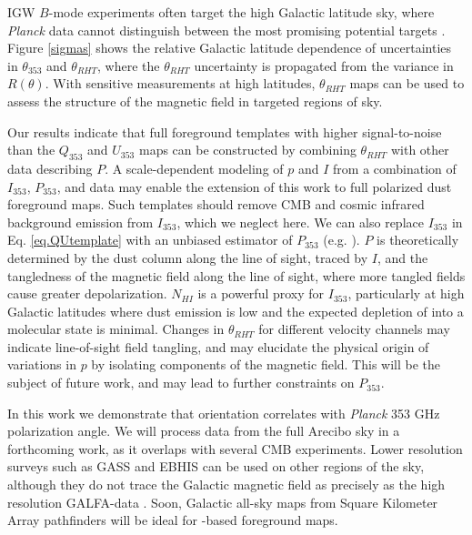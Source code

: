 IGW $B$-mode experiments often target the high Galactic latitude sky, where \textit{Planck} data cannot distinguish between the most promising potential targets \cite{Kovetz:2015tc}. Figure \ref{sigmas} shows the relative Galactic latitude dependence of uncertainties in $\theta_{353}$ and $\theta_{RHT}$, where the $\theta_{RHT}$ uncertainty is propagated from the variance in $R\left(\theta\right)$. With sensitive measurements at high latitudes, $\theta_{RHT}$ maps can be used to assess the structure of the magnetic field in targeted regions of sky.

Our results indicate that full foreground templates with higher signal-to-noise than the $Q_{353}$ and $U_{353}$ maps can be constructed by combining $\theta_{RHT}$ with other data describing $P$. A scale-dependent modeling of $p$ and $I$ from a combination of $I_{353}$, $P_{353}$, and \hi data may enable the extension of this work to full polarized dust foreground maps. Such templates should remove CMB and cosmic infrared background emission from $I_{353}$, which we neglect here. We can also replace $I_{353}$ in Eq. \ref{eq.QUtemplate} with an unbiased estimator of $P_{353}$ (e.g. \cite{Plaszczynski:2013gg, 2014arXiv1410.4436V}). $P$ is theoretically determined by the dust column along the line of sight, traced by $I$, and the tangledness of the magnetic field along the line of sight, where more tangled fields cause greater depolarization. $N_{HI}$ is a powerful proxy for $I_{353}$, particularly at high Galactic latitudes where dust emission is low and the expected depletion of \hi into a molecular state is minimal. Changes in $\theta_{RHT}$ for different \hi velocity channels may indicate line-of-sight field tangling, and may elucidate the physical origin of variations in $p$ by isolating components of the magnetic field. This will be the subject of future work, and may lead to further \hi constraints on $P_{353}$. 

In this work we demonstrate that \hi orientation correlates with \textit{Planck} 353 GHz polarization angle. We will process \hi data from the full Arecibo sky in a forthcoming work, as it overlaps with several CMB experiments. Lower resolution \hi surveys such as GASS \cite{McClureGriffiths:2009dn} and EBHIS \cite{Kerp:2011ga} can be used on other regions of the sky, although they do not trace the Galactic magnetic field as precisely as the high resolution GALFA-\hi data \cite{Clark:2014it}. Soon, Galactic all-sky maps from Square Kilometer Array pathfinders \cite{2012MNRAS.426.3385D} will be ideal for \HI-based foreground maps.

